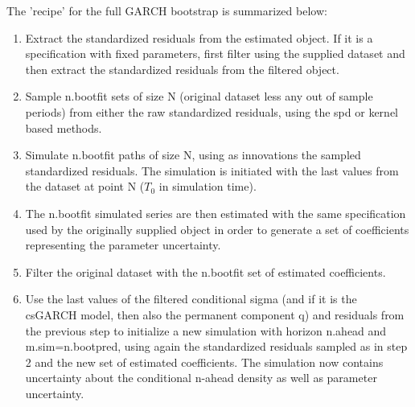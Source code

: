 The 'recipe' for the full GARCH bootstrap is summarized below:
\begin{enumerate}
\item Extract the standardized residuals from the estimated object. If it is a specification with
fixed parameters, first filter using the supplied dataset and then extract the standardized
residuals from the filtered object.
\item Sample n.bootfit sets of size N (original dataset less any out of sample periods) from either
the raw standardized residuals, using the spd or kernel based methods.
\item Simulate n.bootfit paths of size N, using as innovations the sampled standardized residuals. The
simulation is initiated with the last values from the dataset at point N ($T_0$ in simulation time).
\item The n.bootfit simulated series are then estimated with the same specification used by the originally
supplied object in order to generate a set of coefficients representing the parameter uncertainty.
\item Filter the original dataset with the n.bootfit set of estimated coefficients.
\item Use the last values of the filtered conditional sigma (and if it is the csGARCH model, then also the
permanent component q) and residuals from the previous step to initialize a new simulation with horizon
n.ahead and m.sim=n.bootpred, using again the standardized residuals sampled as in step 2 and the new set of
estimated coefficients. The simulation now contains uncertainty about the conditional n-ahead density as well
as parameter uncertainty.
\end{enumerate}
